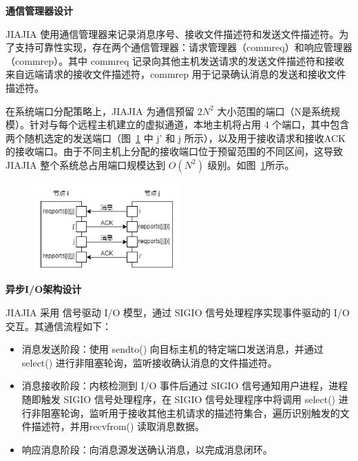 {\textbf{通信管理器设计}

JIAJIA 使用通信管理器来记录消息序号、接收文件描述符和发送文件描述符。为了支持可靠性实现，存在两个通信管理器：请求管理器（commreq）和响应管理器（commrep）。其中 commreq 记录向其他主机发送请求的发送文件描述符和接收来自远端请求的接收文件描述符，commrep 用于记录确认消息的发送和接收文件描述符。

在系统端口分配策略上，JIAJIA 为通信预留 $2N^2$ 大小范围的端口（N是系统规模）。针对与每个远程主机建立的虚拟通道，本地主机将占用 4 个端口，其中包含两个随机选定的发送端口（图~\ref{fig:JIAJIA-ports} 中 j' 和 j 所示），以及用于接收请求和接收ACK的接收端口。由于不同主机上分配的接收端口位于预留范围的不同区间，这导致JIAJIA 整个系统总占用端口规模达到 $O(N^2)$ 级别。如图~\ref{fig:JIAJIA-ports}所示。

    \begin{figure}[!htbp]
        \centering
        \includegraphics[width=0.50\textwidth]{Img/JIAJIA-ports.png}
        \label{fig:JIAJIA-ports}
    \end{figure}

\textbf{异步I/O架构设计}

JIAJIA 采用 信号驱动 I/O 模型，通过 SIGIO 信号处理程序实现事件驱动的 I/O 交互。其通信流程如下：
\begin{itemize}
    \item 消息发送阶段：使用 sendto() 向目标主机的特定端口发送消息，并通过 select() 进行非阻塞轮询，监听接收确认消息的文件描述符。
    \item 消息接收阶段：内核检测到 I/O 事件后通过 SIGIO 信号通知用户进程，进程随即触发 SIGIO 信号处理程序，在 SIGIO 信号处理程序中将调用 select() 进行非阻塞轮询，监听用于接收其他主机请求的描述符集合，遍历识别触发的文件描述符，并用recvfrom() 读取消息数据。
    \item 响应消息阶段：向消息源发送确认消息，以完成消息闭环。
\end{itemize}

}
